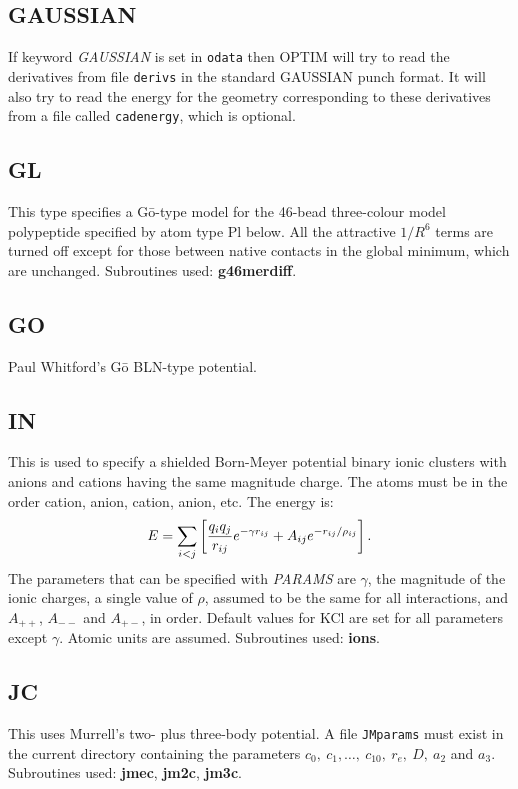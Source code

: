 \documentclass[12pt,a4paper,dvips]{article}
\begin{document}
\subsection{GAUSSIAN}If keyword {\it GAUSSIAN\/} is set in {\tt odata} then
OPTIM will try to read the derivatives from file {\tt derivs} in the
standard GAUSSIAN punch format.
It will also try to read the energy for the geometry
corresponding to these derivatives from a file called {\tt cadenergy}, which is optional.

\subsection{GL}This type specifies a G\={o}-type model\cite{uedatg78} for the
46-bead three-colour model polypeptide specified by atom type Pl below. 
All the attractive $1/R^6$ terms are turned off except for those between
native contacts in the global minimum, which are unchanged.
Subroutines used: {\bf g46merdiff}.

\subsection{GO}Paul Whitford's G\={o} BLN-type potential.

\subsection{IN}This is used to specify a shielded Born-Meyer potential binary ionic clusters with
anions and cations having the same magnitude charge.
The atoms must be in the order cation, anion, cation, anion, etc. The energy is:
$$ E = \sum_{i<j} \left[ {q_iq_j\over r_{ij}} e^{-\gamma r_{ij}} + A_{ij}e^{-r_{ij}/\rho_{ij}} \right]. $$
The parameters that can
be specified with {\it PARAMS\/} are $\gamma$, the magnitude of the ionic charges, a single
value of $\rho$, assumed to be the same for all interactions, and $A_{++}$, $A_{--}$ and
$A_{+-}$, in order. Default values for KCl are set for all parameters except $\gamma$.
Atomic units are assumed. Subroutines used: {\bf ions}.

\subsection{JC}This uses Murrell's two- plus three-body 
potential.\cite{murrellm90,murrellr90,alderzijmr91,eggenjlm92,fengjm93} 
A file {\tt JMparams} must
exist in the current directory containing the parameters $c_0,\ c_1,\ldots,\ c_{10},\ r_e,\ 
D,\ a_2$ and $a_3$. Subroutines used: {\bf jmec}, {\bf jm2c}, {\bf jm3c}.
\end{document}
